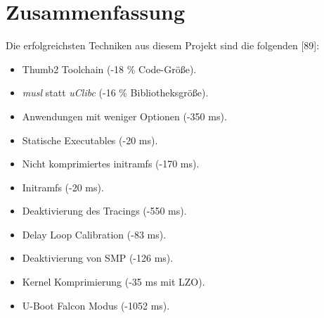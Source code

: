 
\section{Zusammenfassung}
Die erfolgreichsten Techniken aus diesem Projekt sind die folgenden [89]:
\begin{itemize}
	\item  Thumb2 Toolchain (-18 \% Code-Größe).
	\item \textit{musl} statt \textit{uClibc} (-16 \% Bibliotheksgröße).
	\item Anwendungen mit weniger Optionen (-350 ms).
	\item Statische Executables (-20 ms).
	\item Nicht komprimiertes initramfs (-170 ms).
	\item Initramfs (-20 ms).
	\item Deaktivierung des Tracings (-550 ms).
	\item Delay Loop Calibration (-83 ms).
	\item Deaktivierung von SMP (-126 ms).
	\item Kernel Komprimierung (-35 ms mit LZO).
	\item U-Boot Falcon Modus (-1052 ms).
\end{itemize}

